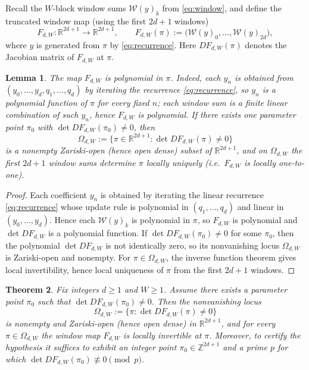 \documentclass[11pt,reqno]{amsart}
\newtheorem{theorem}{Theorem}[section]
\newtheorem{lemma}[theorem]{Lemma}
\theoremstyle{definition}
\theoremstyle{remark}
\newcommand{\R}{\mathbb{R}}
\newcommand{\1}{\mathbf{1}}
\providecommand{\Z}{\mathbb{Z}}
\begin{document}
Recall the $W$-block window sums $\mathcal W(y)_k$ from \eqref{eq:window}, and define the truncated window map (using the first $2d+1$ windows)
\[
F_{d,W}:\R^{2d+1}\to\R^{2d+1},\qquad
F_{d,W}(\pi):=\bigl(\mathcal W(y)_0,\dots,\mathcal W(y)_{2d}\bigr),
\]
where $y$ is generated from $\pi$ by \eqref{eq:recurrence}.
Here $D F_{d,W}(\pi)$ denotes the Jacobian matrix of $F_{d,W}$ at $\pi$.


\begin{lemma}\label{lem:window-generic-local}
The map $F_{d,W}$ is polynomial in $\pi$.
Indeed, each $y_n$ is obtained from $(y_0,\dots,y_d,q_1,\dots,q_d)$ by iterating the recurrence \eqref{eq:recurrence}, so $y_n$ is a polynomial function of $\pi$ for every fixed $n$; each window sum is a finite linear combination of such $y_n$, hence $F_{d,W}$ is polynomial. If there exists \emph{one} parameter point $\pi_0$
with $\det DF_{d,W}(\pi_0)\neq 0$, then
\[
\Omega_{d,W}:=\{\pi\in\R^{2d+1}:\det DF_{d,W}(\pi)\neq 0\}
\]
is a nonempty Zariski-open (hence open dense) subset of $\R^{2d+1}$, and on $\Omega_{d,W}$
the first $2d+1$ window sums determine $\pi$ \emph{locally uniquely} (i.e.\ $F_{d,W}$ is locally
one-to-one).
\end{lemma}

\begin{proof}
Each coefficient $y_n$ is obtained by iterating the linear recurrence \eqref{eq:recurrence} whose
update rule is polynomial in $(q_1,\dots,q_d)$ and linear in $(y_0,\dots,y_d)$. Hence each
$\mathcal W(y)_k$ is polynomial in $\pi$, so $F_{d,W}$ is polynomial and $\det DF_{d,W}$ is a
polynomial function. If $\det DF_{d,W}(\pi_0)\neq 0$ for some $\pi_0$, then the polynomial
$\det DF_{d,W}$ is not identically zero, so its nonvanishing locus $\Omega_{d,W}$ is Zariski-open
and nonempty. For $\pi\in\Omega_{d,W}$, the inverse function theorem gives local invertibility,
hence local uniqueness of $\pi$ from the first $2d+1$ windows.
\end{proof}



\begin{theorem}\label{thm:generic-full-rank}
Fix integers $d\ge 1$ and $W\ge 1$. Assume there exists a parameter point $\pi_0$ such that $\det DF_{d,W}(\pi_0)\neq 0$. Then the nonvanishing locus
\[
\Omega_{d,W}:=\{\pi:\det DF_{d,W}(\pi)\neq 0\}
\]
is nonempty and Zariski-open (hence open dense) in $\R^{2d+1}$, and for every $\pi\in\Omega_{d,W}$ the window map $F_{d,W}$ is locally invertible at $\pi$. Moreover, to certify the hypothesis it suffices to exhibit an integer point $\pi_0\in\Z^{2d+1}$ and a prime $p$ for which $\det DF_{d,W}(\pi_0)\not\equiv 0\pmod p$.
\end{theorem}
\end{document}
